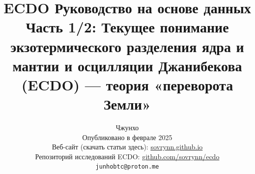 \documentclass[10pt,twocolumn,letterpaper]{article}
\begin{document}
\title{ECDO Руководство на основе данных Часть 1/2: Текущее понимание экзотермического разделения ядра и мантии и осцилляции Джанибекова (ECDO) — теория «переворота Земли»}

\author{Чжунхо\\
Опубликовано в феврале 2025\\
Веб-сайт (скачать статьи здесь): \href{https://sovrynn.github.io}{sovrynn.github.io}\\
Репозиторий исследований ECDO: \href{https://github.com/sovrynn/ecdo}{github.com/sovrynn/ecdo}\\
{\tt\small junhobtc@proton.me}
}

\maketitle
\end{document}
